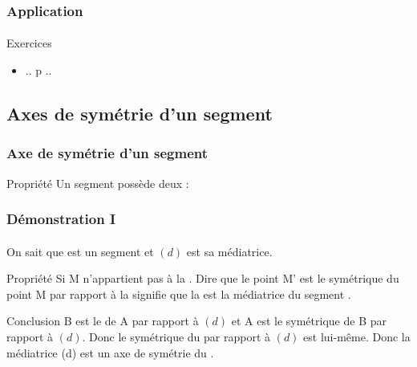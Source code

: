 \documentclass{beamer}
\begin{document}
\begin{frame}
\frametitle{Application}  
\framesubtitle{}

\begin{block}{Exercices}
	\begin{itemize}
		\item .. p ..
	\end{itemize}
\end{block}
	
\end{frame}

\subsection{Axes de symétrie d'un segment}

\begin{frame}
\frametitle{Axe de symétrie d'un segment}  


\begin{alertblock}{Propriété}
	Un segment possède deux \asyms :
	\begin{itemize}
	\end{itemize}
\end{alertblock}

\end{frame}

\begin{frame}
	\frametitle{Démonstration I}  
	\framesubtitle{}

\begin{block}{On sait que}
 est un segment et $(d)$ est sa médiatrice.\pause
\end{block}

\begin{block}{Propriété}
	Si M n'appartient pas à la .
	Dire que le point M' est le symétrique du point M par rapport à la  signifie que la  est la médiatrice du segment .\pause
\end{block}

\begin{block}{Conclusion}
	B est le \sym  de A par rapport à $(d)$ et A est le symétrique de B par rapport à $(d)$.
	Donc le symétrique du  par rapport à $(d)$ est lui-même.
	Donc la médiatrice (d) est un axe de symétrie du .
\end{block}
\end{frame}
\end{document}

